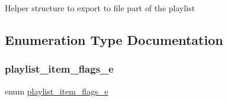 Helper structure to export to file part of the playlist 

\subsection{Enumeration Type Documentation}
\mbox{\label{group__vlc__playlist_ga8e081f83afd54626ee47766bdca9d807}} 
\subsubsection{\texorpdfstring{playlist\+\_\+item\+\_\+flags\+\_\+e}{playlist\_item\_flags\_e}}
{\footnotesize\ttfamily enum \hyperlink{group__vlc__playlist_ga8e081f83afd54626ee47766bdca9d807}{playlist\+\_\+item\+\_\+flags\+\_\+e}}

